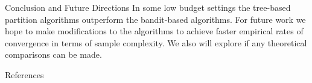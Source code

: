 \documentclass[final]{beamer}
\newlength{\onecolwid}
\begin{document}
\begin{frame}[t]
\begin{columns}[t]
\begin{column}{\onecolwid}
\begin{block}{Conclusion and Future Directions}
In some low budget settings the tree-based partition algorithms outperform the bandit-based algorithms. For future work we hope to make modifications to the algorithms to achieve faster empirical rates of convergence in terms of sample complexity. We also will explore if any theoretical comparisons can be made.

\end{block}


\begin{block}{References}
\tiny


\end{block}


%
%
%


%
%
%


\end{column}
\end{columns}
\end{frame}
\end{document}
